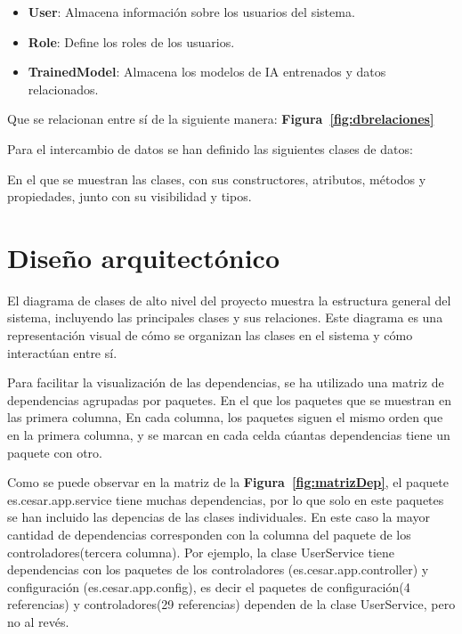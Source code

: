 \begin{itemize}
    \item \textbf{User}: Almacena información sobre los usuarios del sistema.
    \item \textbf{Role}: Define los roles de los usuarios.
    \item \textbf{TrainedModel}: Almacena los modelos de IA entrenados y datos relacionados.
\end{itemize}
Que se relacionan entre sí de la siguiente manera: \textbf{Figura~\ref{fig:dbrelaciones}}

Para el intercambio de datos se han definido las siguientes clases de datos:

En el que se muestran las clases, con sus constructores, atributos, métodos y propiedades, junto con su visibilidad y tipos.

\section{Diseño arquitectónico}

El diagrama de clases de alto nivel del proyecto muestra la estructura general del sistema, incluyendo las principales clases y sus relaciones. Este diagrama es una representación visual de cómo se organizan las clases en el sistema y cómo interactúan entre sí.

Para facilitar la visualización de las dependencias, se ha utilizado una matriz de dependencias agrupadas por paquetes. En el que los paquetes que se muestran en las primera columna, 
En cada columna, los paquetes siguen el mismo orden que en la primera columna, y se marcan en cada celda cúantas dependencias tiene un paquete con otro.

Como se puede observar en la matriz de la \textbf{Figura~\ref{fig:matrizDep}}, el paquete es.cesar.app.service tiene muchas dependencias, por lo que solo en este paquetes se han incluido las depencias de las clases individuales. En este caso la mayor cantidad de dependencias corresponden con la columna del paquete de los controladores(tercera columna). Por ejemplo, la clase UserService tiene dependencias con los paquetes de los controladores (es.cesar.app.controller) y configuración (es.cesar.app.config), es decir el paquetes de configuración(4 referencias) y controladores(29 referencias) dependen de la clase UserService, pero no al revés.

